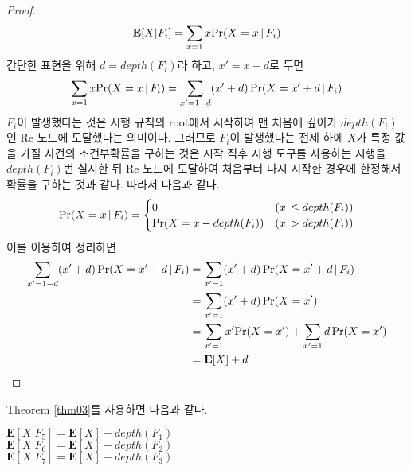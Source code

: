 \documentclass[11pt]{article}
\begin{document}
\begin{proof}
\[\textnormal{\textbf{E}}[X|F_{i}] = \sum_{x=1} x \textnormal{Pr}(X = x\,|\,F_{i})\]
간단한 표현을 위해 $d = depth(F_{i})$라 하고, $x'=x-d$로 두면
\[\sum_{x=1} x \textnormal{Pr}(X = x\,|\,F_{i}) = \sum_{x'=1-d} (x'+d)\,\textnormal{Pr}(X = x'+d\,|\,F_{i})\]
$F_{i}$이 발생했다는 것은 시행 규칙의 root에서 시작하여 맨 처음에 깊이가 $depth(F_{i})$인 Re 노드에 도달했다는 의미이다. 그러므로 $F_{i}$이 발생했다는 전제 하에 $X$가 특정 값을 가질 사건의 조건부확률을 구하는 것은 시작 직후 시행 도구를 사용하는 시행을 $depth(F_{i})$번 실시한 뒤 Re 노드에 도달하여 처음부터 다시 시작한 경우에 한정해서 확률을 구하는 것과 같다. 따라서 다음과 같다.
\[
\textnormal{Pr}(X = x\,|\,F_{i}) =
\begin{cases}
0 & (x\,\le depth(F_{i}))\\
\textnormal{Pr}(X = x-depth(F_{i})) & (x\,> depth(F_{i}))
\end{cases}
\]
이를 이용하여 정리하면
\[
\begin{split}
\sum_{x'=1-d} (x'+d)\,\textnormal{Pr}(X = x'+d\,|\,F_{i}) & = \sum_{x'=1} (x'+d)\,\textnormal{Pr}(X = x'+d\,|\,F_{i})\\
& = \sum_{x'=1} (x'+d)\,\textnormal{Pr}(X = x')\\
& = \sum_{x'=1} x'\textnormal{Pr}(X = x') + \sum_{x'=1} d\,\textnormal{Pr}(X = x')\\
& = \textnormal{\textbf{E}}[X]+d
\end{split}
\]
\end{proof}
\noindent Theorem \ref{thm03}를 사용하면 다음과 같다.

\singlespacing
\begin{center}
$\textbf{E}[X|F_{5}]=\textbf{E}[X]+depth(F_{1})$\\
$\textbf{E}[X|F_{6}]=\textbf{E}[X]+depth(F_{2})$\\
$\textbf{E}[X|F_{7}]=\textbf{E}[X]+depth(F_{3})$\\
\end{center}
\doublespacing
\end{document}
